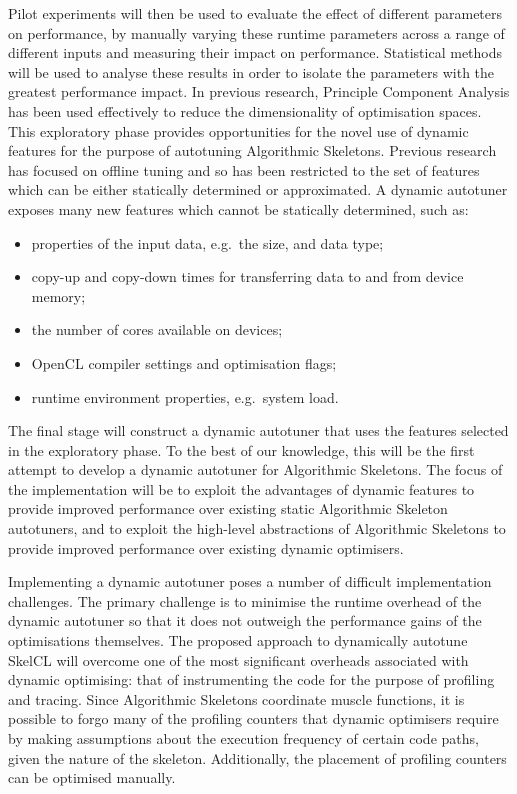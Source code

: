 Pilot experiments will then be used to evaluate the effect of
different parameters on performance, by manually varying these runtime
parameters across a range of different inputs and measuring their
impact on performance. Statistical methods will be used to analyse
these results in order to isolate the parameters with the greatest
performance impact. In previous research, Principle Component Analysis
has been used effectively to reduce the dimensionality of optimisation
spaces. This exploratory phase provides opportunities for the novel
use of dynamic features for the purpose of autotuning Algorithmic
Skeletons. Previous research has focused on offline tuning and so has
been restricted to the set of features which can be either statically
determined or approximated. A dynamic autotuner exposes many new
features which cannot be statically determined, such as:

\begin{itemize}
\item properties of the input data, e.g.\ the size, and data type;
\item copy-up and copy-down times for transferring data to and from
  device memory;
\item the number of cores available on devices;
\item OpenCL compiler settings and optimisation flags;
\item runtime environment properties, e.g.\ system load.
\end{itemize}

The final stage will construct a dynamic autotuner that uses the
features selected in the exploratory phase. To the best of our
knowledge, this will be the first attempt to develop a dynamic
autotuner for Algorithmic Skeletons. The focus of the implementation
will be to exploit the advantages of dynamic features to provide
improved performance over existing static Algorithmic Skeleton
autotuners, and to exploit the high-level abstractions of Algorithmic
Skeletons to provide improved performance over existing dynamic
optimisers.

Implementing a dynamic autotuner poses a number of difficult
implementation challenges. The primary challenge is to minimise the
runtime overhead of the dynamic autotuner so that it does not outweigh
the performance gains of the optimisations themselves. The proposed
approach to dynamically autotune SkelCL will overcome one of the most
significant overheads associated with dynamic optimising: that of
instrumenting the code for the purpose of profiling and tracing. Since
Algorithmic Skeletons coordinate muscle functions, it is possible to
forgo many of the profiling counters that dynamic optimisers require
by making assumptions about the execution frequency of certain code
paths, given the nature of the skeleton. Additionally, the placement
of profiling counters can be optimised manually.

